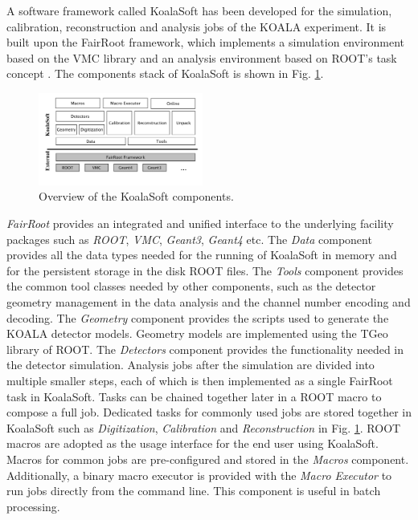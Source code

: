\documentclass[number,5p]{elsarticle}
\begin{document}
A software framework called KoalaSoft has been developed for the simulation, calibration, reconstruction and analysis jobs of the KOALA experiment.
It is built upon the FairRoot \cite{fairroot} framework, which implements a
simulation environment based on the VMC \cite{vmc} library and an analysis
environment based on ROOT's task concept \cite{root}.
The components stack of KoalaSoft is shown in Fig. \ref{fig:koalasoft}.

\begin{figure}[htbp]
  \centering
  \includegraphics[width=0.48\textwidth]{./koalasoft_components.png}
  \caption{Overview of the KoalaSoft components.}
  \label{fig:koalasoft}
\end{figure}

\textit{FairRoot} provides an integrated and unified interface to the underlying facility
packages such as \textit{ROOT}, \textit{VMC}, \textit{Geant3}, \textit{Geant4} etc.
The \textit{Data} component provides all the data types needed for the running
of KoalaSoft in memory and for the persistent storage in the disk ROOT files.
The \textit{Tools} component provides the common tool classes needed by other
components, such as the detector geometry management in the data analysis and
the channel number encoding and decoding.
The \textit{Geometry} component provides the scripts  used to generate the KOALA detector models.
Geometry models are implemented using the TGeo library of ROOT.
The \textit{Detectors} component provides the functionality needed in the
detector simulation.
Analysis jobs after the simulation are divided into multiple smaller steps, each of which is
then implemented as a single FairRoot task in KoalaSoft.
Tasks can be chained together later in a ROOT macro to compose a full job. 
Dedicated tasks for commonly used jobs are stored together in KoalaSoft such as
\textit{Digitization}, \textit{Calibration} and \textit{Reconstruction} in
Fig. \ref{fig:koalasoft}.
ROOT macros are adopted as the usage interface for the end user using KoalaSoft.
Macros for common jobs are pre-configured and stored in the \textit{Macros} component.
Additionally, a binary macro executor is provided with the \textit{Macro
  Executor} to run jobs directly from the command line. This component is useful in batch processing.
\end{document}

